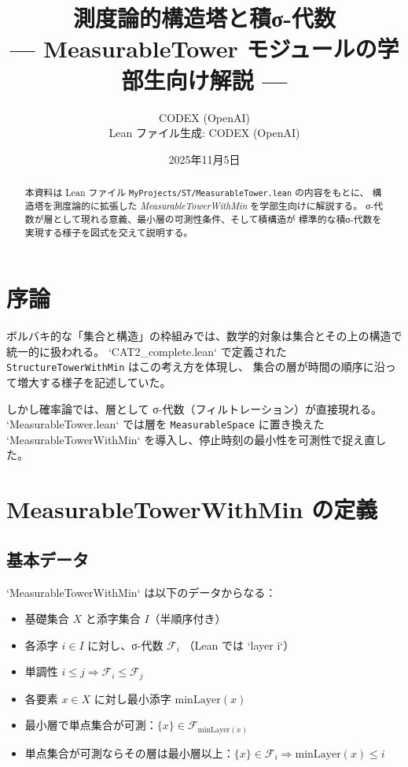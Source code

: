 \documentclass[a4paper,11pt]{ltjsarticle}
\title{測度論的構造塔と積σ-代数\\\smallskip
{\large--- MeasurableTower モジュールの学部生向け解説 ---}}
\author{CODEX (OpenAI)\\Lean ファイル生成: CODEX (OpenAI)}
\date{2025年11月5日}
\begin{document}
\maketitle

\begin{abstract}
本資料は Lean ファイル \texttt{MyProjects/ST/MeasurableTower.lean} の内容をもとに、
構造塔を測度論的に拡張した \emph{MeasurableTowerWithMin} を学部生向けに解説する。
σ-代数が層として現れる意義、最小層の可測性条件、そして積構造が
標準的な積σ-代数を実現する様子を図式を交えて説明する。
\end{abstract}

\tableofcontents

\section{序論}

ボルバキ的な「集合と構造」の枠組みでは、数学的対象は集合とその上の構造で統一的に扱われる。
`CAT2_complete.lean` で定義された \texttt{StructureTowerWithMin} はこの考え方を体現し、
集合の層が時間の順序に沿って増大する様子を記述していた。

しかし確率論では、層として σ-代数（フィルトレーション）が直接現れる。
`MeasurableTower.lean` では層を \texttt{MeasurableSpace} に置き換えた
`MeasurableTowerWithMin` を導入し、停止時刻の最小性を可測性で捉え直した。

\section{MeasurableTowerWithMin の定義}

\subsection{基本データ}

`MeasurableTowerWithMin` は以下のデータからなる：
\begin{itemize}
  \item 基礎集合 \(X\) と添字集合 \(I\)（半順序付き）
  \item 各添字 \(i \in I\) に対し、σ-代数 \( \mathcal{F}_i \) （Lean では `layer i`）
  \item 単調性 \(i \le j \Rightarrow \mathcal{F}_i \le \mathcal{F}_j\)
  \item 各要素 \(x \in X\) に対し最小添字 \(\mathrm{minLayer}(x)\)
  \item 最小層で単点集合が可測：\(\{x\} \in \mathcal{F}_{\mathrm{minLayer}(x)}\)
  \item 単点集合が可測ならその層は最小層以上：\(\{x\} \in \mathcal{F}_i \Rightarrow \mathrm{minLayer}(x) \le i\)
\end{itemize}
\end{document}
